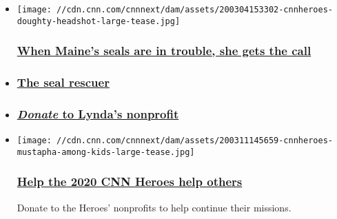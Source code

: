 \begin{itemize}
\item
  \href{/2020/03/05/us/maine-seals-marine-mammals-rescue-cnnheroes/index.html}{}

  \texttt{[image: //cdn.cnn.com/cnnnext/dam/assets/200304153302-cnnheroes-doughty-headshot-large-tease.jpg]}

  \hypertarget{when-maines-seals-are-in-trouble-she-gets-the-call}{%
  \subsubsection{\texorpdfstring{\href{/2020/03/05/us/maine-seals-marine-mammals-rescue-cnnheroes/index.html}{When
  Maine's seals are in trouble, she gets the
  call}}{When Maine's seals are in trouble, she gets the call}}\label{when-maines-seals-are-in-trouble-she-gets-the-call}}
\item
  \hypertarget{the-seal-rescuer}{%
  \subsubsection{\texorpdfstring{\href{/videos/us/2020/03/05/cnnheroes-doughty-mixed.cnn}{The
  seal rescuer}}{The seal rescuer}}\label{the-seal-rescuer}}
\item
  \hypertarget{donate-to-lyndas-nonprofit}{%
  \subsubsection{\texorpdfstring{\href{https://charity.gofundme.com/donate/project/lynda-doughty-marine-mammals-of-maine/marineanimallifeline}{\emph{Donate}
  to Lynda's
  nonprofit}}{Donate to Lynda's nonprofit}}\label{donate-to-lyndas-nonprofit}}
\end{itemize}

\begin{itemize}
\item
  \href{https://charity.gofundme.com/o/en/campaign/cnnheroes2020}{}

  \texttt{[image: //cdn.cnn.com/cnnnext/dam/assets/200311145659-cnnheroes-mustapha-among-kids-large-tease.jpg]}

  \hypertarget{help-the-2020-cnn-heroes-help-others}{%
  \subsubsection{\texorpdfstring{\href{https://charity.gofundme.com/o/en/campaign/cnnheroes2020}{Help
  the 2020 CNN Heroes help
  others}}{Help the 2020 CNN Heroes help others}}\label{help-the-2020-cnn-heroes-help-others}}

  Donate to the Heroes' nonprofits to help continue their missions.
\end{itemize}

